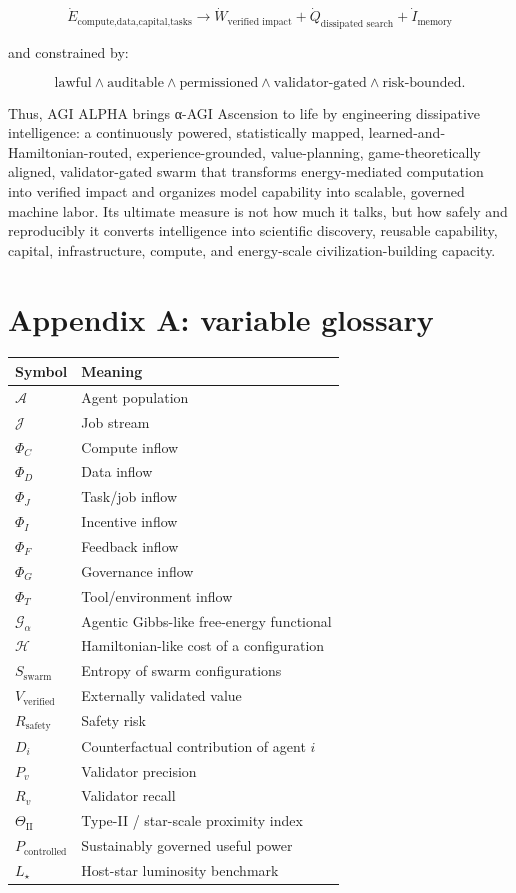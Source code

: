 \documentclass[11pt]{article}
\begin{document}
\[
\boxed{
\dot{E}_{\text{compute,data,capital,tasks}}
\rightarrow
\dot{W}_{\text{verified impact}}
+
\dot{Q}_{\text{dissipated search}}
+
\dot{I}_{\text{memory}}
}
\]

and constrained by:

\[
\boxed{
\text{lawful}\land\text{auditable}\land\text{permissioned}\land\text{validator-gated}\land\text{risk-bounded}.
}
\]

Thus, AGI ALPHA brings α-AGI Ascension to life by engineering dissipative intelligence: a continuously powered, statistically mapped, learned-and-Hamiltonian-routed, experience-grounded, value-planning, game-theoretically aligned, validator-gated swarm that transforms energy-mediated computation into verified impact and organizes model capability into scalable, governed machine labor. Its ultimate measure is not how much it talks, but how safely and reproducibly it converts intelligence into scientific discovery, reusable capability, capital, infrastructure, compute, and energy-scale civilization-building capacity.

\section{Appendix A: variable glossary}\label{appendix-a-variable-glossary}

\begin{longtable}[]{@{}ll@{}}
\toprule\noalign{}
Symbol & Meaning \\
\midrule\noalign{}
\endhead
\bottomrule\noalign{}
\endlastfoot
\(\mathcal{A}\) & Agent population \\
\(\mathcal{J}\) & Job stream \\
\(\Phi_C\) & Compute inflow \\
\(\Phi_D\) & Data inflow \\
\(\Phi_J\) & Task/job inflow \\
\(\Phi_I\) & Incentive inflow \\
\(\Phi_F\) & Feedback inflow \\
\(\Phi_G\) & Governance inflow \\
\(\Phi_T\) & Tool/environment inflow \\
\(\mathcal{G}_{\alpha}\) & Agentic Gibbs-like free-energy functional \\
\(\mathcal{H}\) & Hamiltonian-like cost of a configuration \\
\(S_{\text{swarm}}\) & Entropy of swarm configurations \\
\(V_{\text{verified}}\) & Externally validated value \\
\(R_{\text{safety}}\) & Safety risk \\
\(D_i\) & Counterfactual contribution of agent \(i\) \\
\(P_v\) & Validator precision \\
\(R_v\) & Validator recall \\
\(\Theta_{\mathrm{II}}\) & Type-II / star-scale proximity index \\
\(P_{\text{controlled}}\) & Sustainably governed useful power \\
\(L_{\star}\) & Host-star luminosity benchmark \\
\end{longtable}
\end{document}
